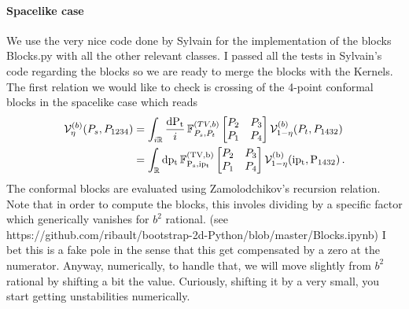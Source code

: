 \documentclass[11pt]{article}
\begin{document}
\paragraph{Spacelike case}

We use the very nice code done by Sylvain for the implementation of the blocks Blocks.py with all the other relevant classes. I passed all the tests in Sylvain's code regarding the blocks so we are ready to merge the blocks with the Kernels. The first relation we would like to check is crossing of the 4-point conformal blocks in the spacelike case which reads
\begin{equation}
\begin{aligned}
    \mathcal{V}_{\eta}^{(b)}(P_s,P_{1234}) &= \int_{i\mathbb{R}} \frac{\rm{d}P_t}{i}\, \mathbb{F}^{(TV,b)}_{P_s, P_t} \begin{bmatrix}
     P_2 & P_3 \\
     P_1 & P_4
    \end{bmatrix}
    \mathcal{V}^{(b)}_{1-\eta}(P_t,P_{1432})\\
    &= \int_{\mathbb{R}} \rm{d}p_t\, \mathbb{F}^{(TV,b)}_{P_s, ip_t} \begin{bmatrix}
     P_2 & P_3 \\
     P_1 & P_4
    \end{bmatrix}
    \mathcal{V}^{(b)}_{1-\eta}(ip_t,P_{1432})\,.
\end{aligned}
\end{equation}
The conformal blocks are evaluated using Zamolodchikov's recursion relation. Note that in order to compute the blocks, this involes dividing by a specific factor which generically vanishes for $b^2$ rational. (see https://github.com/ribault/bootstrap-2d-Python/blob/master/Blocks.ipynb) I bet this is a fake pole in the sense that this get compensated by a zero at the numerator. Anyway, numerically, to handle that, we will move slightly from $b^2$ rational by shifting a bit the value. Curiously, shifting it by a very small, you start getting unstabilities numerically. 
\end{document}
